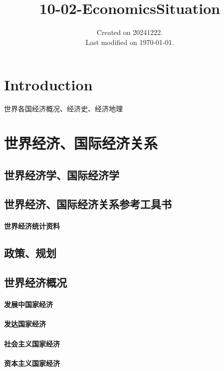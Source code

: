 \documentclass[UTF8]{../../RepresentationUniverse}
\begin{document}
\title{10-02-EconomicsSituation}
\date{Created on 20241222.\\   Last modified on \today.}
\maketitle
\tableofcontents


\chapter{Introduction}

世界各国经济概况、经济史、经济地理




\chapter{世界经济、国际经济关系}

\section{世界经济学、国际经济学}
\section{世界经济、国际经济关系参考工具书}
    \subsubsection{世界经济统计资料}
\section{政策、规划}
\section{世界经济概况}
    \subsubsection{发展中国家经济}
    \subsubsection{发达国家经济}
    \subsubsection{社会主义国家经济}
    \subsubsection{资本主义国家经济}
\end{document}
